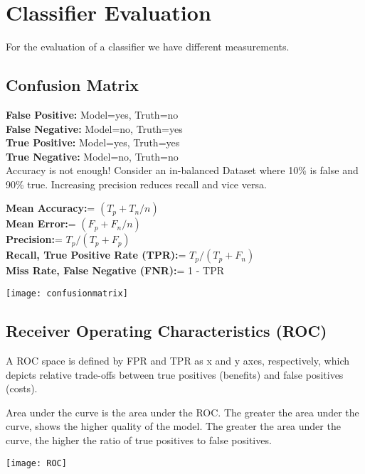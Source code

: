 \section{Classifier Evaluation}
For the evaluation of a classifier we have different measurements.

\subsection{Confusion Matrix}
\begin{minipage}{0,6\linewidth}
	\textbf{False Positive:} Model=yes, Truth=no \\
	\textbf{False Negative:} Model=no, Truth=yes \\
	\textbf{True Positive:} Model=yes, Truth=yes \\
	\textbf{True Negative:} Model=no, Truth=no  \\
	Accuracy is not enough! Consider an in-balanced Dataset where 10\% is false and 90\% true. Increasing precision reduces recall and vice versa.
	
	\centering
	\textbf{Mean Accuracy:}= $(T_{p} + T_{n} / n)$ \\
	\textbf{Mean Error:}= $(F_{p} + F_{n} / n)$ \\
	\textbf{Precision:}= $T_{p} / (T_{p} + F_{p})$ \\
	\textbf{Recall, True Positive Rate (TPR):}= $T_{p} / (T_{p} + F_{n})$ \\
	\textbf{Miss Rate, False Negative (FNR):}= 1 - TPR \\
	
\end{minipage}
\begin{minipage}{0,4\linewidth}
	\centering
	\texttt{[image: confusionmatrix]}  
\end{minipage}

\subsection{Receiver Operating Characteristics (ROC)}
\begin{minipage}{0,7\linewidth}
	A ROC space is defined by FPR and TPR as x and y axes, respectively, which depicts relative trade-offs between true positives (benefits) and false positives (costs).
	
	Area under the curve is the area under the ROC.  The greater the area under the curve, shows the higher quality of the model.  The greater the area under the curve, the higher the ratio of true positives to false positives.
\end{minipage}
\begin{minipage}{0,3\linewidth}
	\texttt{[image: ROC]}  
\end{minipage}


